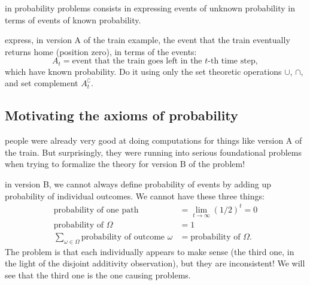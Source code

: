\documentclass{article}
\begin{document}
 in probability problems consists in expressing events of unknown probability in terms of events of known probability. 

 express, in version A of the train example, the event that the train eventually returns home (position zero), in terms of the events: 
\[ A_t = \text{event that the train goes left in the $t$-th time step},\]
which have known probability. Do it using only the set theoretic operations $\cup$, $\cap$, and set complement $A_t^\complement$.


\subsection{Motivating the axioms of probability}

 people were already very good at doing computations for things like version A of the train. But surprisingly, they were running into serious foundational problems when trying to formalize the theory for version B of the problem!

 in version B, we cannot always define probability of events by adding up probability of individual outcomes. We cannot have these three things:
\begin{align*}
	\text{probability of one path} &= \lim_{t \to \infty} (1/2)^t = 0 \\
	\text{probability of $\Omega$} &= 1 \\
	\sum_{\omega \in \Omega} \text{probability of outcome $\omega$} &= \text{probability of $\Omega$}.
\end{align*}
The problem is that each individually appears to make sense (the third one, in the light of the disjoint additivity observation), but they are inconsistent! We will see that the third one is the one causing problems.
\end{document}
